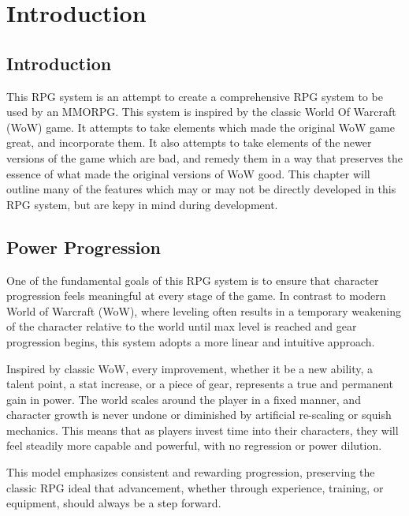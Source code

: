 \chapter{Introduction}\label{ch:introduction}
\pagestyle{fancy}

\section{Introduction}
This RPG system is an attempt to create a comprehensive RPG system to be used by an MMORPG. This system is inspired by the classic World Of Warcraft (WoW) game. It attempts to take elements which made the original WoW game great, and incorporate them. It also attempts to take elements of the newer versions of the game which are bad, and remedy them in a way that preserves the essence of what made the original versions of WoW good. This chapter will outline many of the features which may or may not be directly developed in this RPG system, but are kepy in mind during development.








\section{Power Progression}

One of the fundamental goals of this RPG system is to ensure that character progression feels meaningful at every stage of the game. In contrast to modern World of Warcraft (WoW), where leveling often results in a temporary weakening of the character relative to the world until max level is reached and gear progression begins, this system adopts a more linear and intuitive approach.

Inspired by classic WoW, every improvement, whether it be a new ability, a talent point, a stat increase, or a piece of gear, represents a true and permanent gain in power. The world scales around the player in a fixed manner, and character growth is never undone or diminished by artificial re-scaling or squish mechanics. This means that as players invest time into their characters, they will feel steadily more capable and powerful, with no regression or power dilution.

This model emphasizes consistent and rewarding progression, preserving the classic RPG ideal that advancement, whether through experience, training, or equipment, should always be a step forward.






